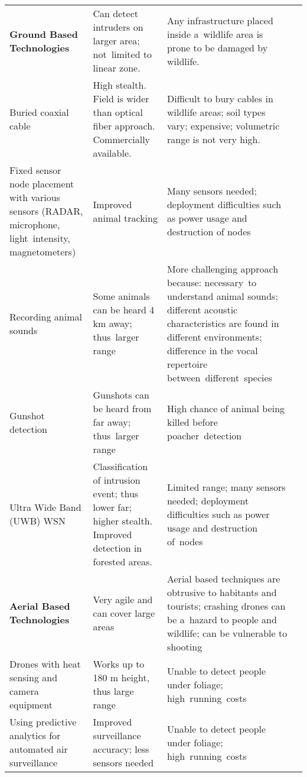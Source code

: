 \begin{table}[htbp]
{\begin{tabular}{p{18.335em}p{19.28em}p{22.28em}p{10.055em}}
\midrule
{\textbf{Ground Based Technologies}} & Can detect intruders on larger area; not~limited to linear zone. & Any infrastructure placed inside a~wildlife area is prone to be damaged by wildlife. & \\
       Buried coaxial cable & High stealth. Field is wider than optical fiber approach. Commercially available. & Difficult to bury cables in wildlife areas; soil types vary; expensive; volumetric range is not very high. & \citep{harman1976guidar,Poirier1982,Harman2005, Inomata2014,Inomata2006} \\
       Fixed sensor node placement with various sensors (RADAR, microphone, light~intensity, magnetometers) & Improved animal tracking & Many sensors needed; deployment difficulties such as power usage and destruction of nodes & \citep{Souza2015,Mishra2010,Arora2004,He2014} \\
       Recording animal sounds & Some animals can be heard 4 km away; thus~larger range & More challenging approach because: necessary~to understand animal sounds; different acoustic characteristics are found in different environments; difference in the vocal repertoire between~different~species & \citep{Zeppelzauer2015} \\
       Gunshot detection & Gunshots can be heard from far away; thus~larger range & High chance of animal being killed before poacher~detection & \citep{Jumnani2014} \\
       Ultra Wide Band (UWB) WSN & Classification of intrusion event; thus lower \gls{far}; higher stealth. Improved detection in forested areas. & Limited range; many sensors needed; deployment difficulties such as power usage and destruction of~nodes & \citep{Zhang2014a,Jiang2014} \\
\midrule
{\textbf{Aerial Based Technologies}} & Very agile and can cover large areas & Aerial based techniques are obtrusive to habitants and tourists; crashing drones can be a~hazard to people and wildlife; can be vulnerable to shooting & \\
       Drones with heat sensing and camera equipment & Works up to 180 m height, thus large range & Unable to detect people under foliage; high~running~costs & \citep{Mulero-Pazmany2014,Zhang2014,wcuavc_web} \\
       Using predictive analytics for automated air surveillance & Improved surveillance accuracy; less sensors needed & Unable to detect people under foliage; high~running~costs & \citep{NoseongPark2015, Park2016} \\
\midrule

\end{tabular}}
\end{table}
